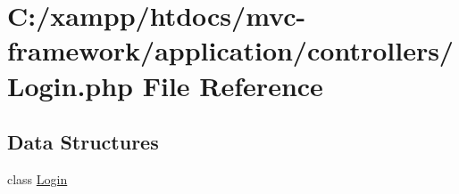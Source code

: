 \hypertarget{controllers_2_login_8php}{}\section{C\+:/xampp/htdocs/mvc-\/framework/application/controllers/\+Login.php File Reference}
\label{controllers_2_login_8php}
\subsection*{Data Structures}
\begin{DoxyCompactItemize}
\item 
class \hyperlink{class_login}{Login}
\end{DoxyCompactItemize}
